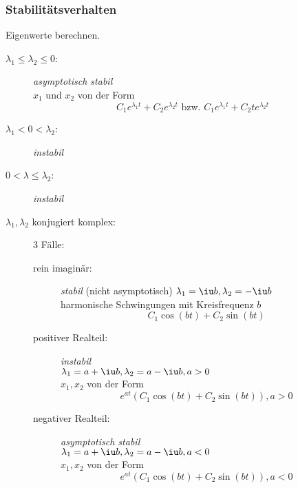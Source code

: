 		\subsubsection{Stabilitätsverhalten} %
			Eigenwerte berechnen.
			\begin{description}
				\item[$\lambda_1 \leq \lambda_2 \leq 0$:]
				\emph{asymptotisch stabil} \\
				$x_1$ und $x_2$ von der Form
				\[
					C_1 e^{\lambda_1 t} + C_2 e^{\lambda_2 t} \text{ bzw. } C_1 e^{\lambda_1 t} + C_2 t e^{\lambda_2 t}
				\]
				\item[$\lambda_1 < 0 < \lambda_2$:] \emph{instabil}
				\item[$0 < \lambda \leq \lambda_2$:] \emph{instabil}
				\item[$\lambda_1, \lambda_2$ konjugiert komplex:] 3 Fälle:
					\begin{description}
						\item[rein imaginär:] \emph{stabil} (nicht asymptotisch)
						$\lambda_1 = \iu b, \lambda_2 = - \iu b$ \\
						harmonische Schwingungen mit Kreisfrequenz $b$
						\[
							C_1 \cos (bt) + C_2 \sin (bt)
						\]
						\item[positiver Realteil:] \emph{instabil} \\
						$\lambda_1 = a + \iu b, \lambda_2 = a - \iu b, a > 0$ \\
						$x_1, x_2$ von der Form
						\[
							e^{at}(C_1 \cos(bt) + C_2 \sin (bt)), a > 0
						\]
						\item[negativer Realteil:] \emph{asymptotisch stabil} \\
						$\lambda_1 = a + \iu b, \lambda_2 = a - \iu b, a < 0$ \\
						$x_1, x_2$ von der Form
						\[
							e^{at}(C_1 \cos(bt) + C_2 \sin (bt)), a < 0
						\]
					\end{description}
			\end{description}
